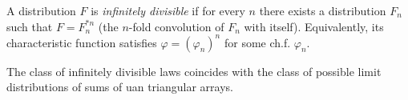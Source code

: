A distribution $F$ is \textit{infinitely divisible} if for every $n$ there exists a distribution $F_n$ such that $F = F_n^{*n}$ (the $n$-fold convolution of $F_n$ with itself). Equivalently, its characteristic function satisfies $\varphi = (\varphi_n)^n$ for some ch.f. $\varphi_n$.

The class of infinitely divisible laws coincides with the class of possible limit distributions of sums of uan triangular arrays.

